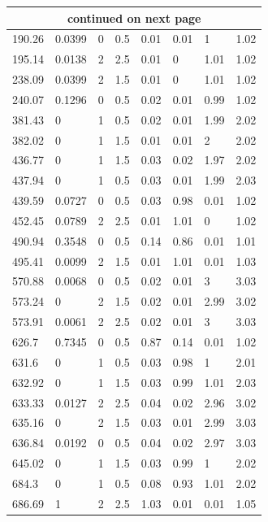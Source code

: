 \begin{longtable}[!h] {p{} p{} p{} p{} p{} p{} p{} p{}}
    \hline \multicolumn{8}{c}{{continued on next page}} \\ \hline
    \endfoot
    
    \hline \hline 
    \endlastfoot
    
	190.26	&	0.0399	&	0	&	0.5	&	0.01	&	0.01	&	1		&	1.02	\\
	195.14	&	0.0138	&	2	&	2.5	&	0.01	&	0		&	1.01	&	1.02    \\
	238.09	&	0.0399	&	2	&	1.5	&	0.01	&	0		&	1.01	&	1.02    \\
	240.07	&	0.1296	&	0	&	0.5	&	0.02	&	0.01	&	0.99	&	1.02    \\
	381.43	&	0		&	1	&	0.5	&	0.02	&	0.01	&	1.99	&	2.02    \\
	382.02	&	0		&	1	&	1.5	&	0.01	&	0.01	&	2		&	2.02    \\
	436.77	&	0		&	1	&	1.5	&	0.03	&	0.02	&	1.97	&	2.02    \\
	437.94	&	0		&	1	&	0.5	&	0.03	&	0.01	&	1.99	&	2.03    \\
	439.59	&	0.0727	&	0	&	0.5	&	0.03	&	0.98	&	0.01	&	1.02    \\
	452.45	&	0.0789	&	2	&	2.5	&	0.01	&	1.01	&	0		&	1.02    \\
	490.94	&	0.3548	&	0	&	0.5	&	0.14	&	0.86	&	0.01	&	1.01    \\
	495.41	&	0.0099	&	2	&	1.5	&	0.01	&	1.01	&	0.01	&	1.03    \\
	570.88	&	0.0068	&	0	&	0.5	&	0.02	&	0.01	&	3		&	3.03    \\
	573.24	&	0		&	2	&	1.5	&	0.02	&	0.01	&	2.99	&	3.02    \\
	573.91	&	0.0061	&	2	&	2.5	&	0.02	&	0.01	&	3		&	3.03    \\
	626.7	&	0.7345	&	0	&	0.5	&	0.87	&	0.14	&	0.01	&	1.02    \\
	631.6	&	0		&	1	&	0.5	&	0.03	&	0.98	&	1		&	2.01    \\
	632.92	&	0		&	1	&	1.5	&	0.03	&	0.99	&	1.01	&	2.03    \\
	633.33	&	0.0127	&	2	&	2.5	&	0.04	&	0.02	&	2.96	&	3.02    \\
	635.16	&	0		&	2	&	1.5	&	0.03	&	0.01	&	2.99	&	3.03    \\
	636.84	&	0.0192	&	0	&	0.5	&	0.04	&	0.02	&	2.97	&	3.03    \\
	645.02	&	0		&	1	&	1.5	&	0.03	&	0.99	&	1		&	2.02    \\
	684.3	&	0		&	1	&	0.5	&	0.08	&	0.93	&	1.01	&	2.02    \\
	686.69	&	1		&	2	&	2.5	&	1.03	&	0.01	&	0.01	&	1.05    \\

\end{longtable}
